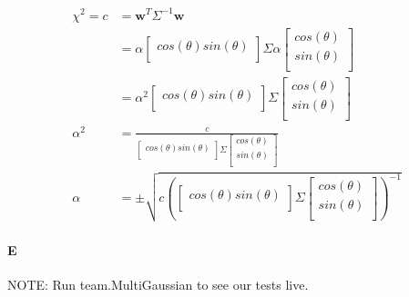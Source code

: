 \documentclass[12pt]{article}
\begin{document}
\begin{align*}
\chi^2 = c &=  \mathbf{w}^T \Sigma^{-1} \mathbf{w} \\
&=  \alpha \left[ {\begin{smallmatrix}
	cos(\theta)  sin(\theta)  \\
	 \end{smallmatrix} } \right]
 	\Sigma
 	\alpha \left[ {\begin{smallmatrix}
	cos(\theta)  \\
	sin(\theta)  \\
	 \end{smallmatrix} } \right] \\
&= \alpha^2 \left[ {\begin{smallmatrix}
	cos(\theta)  sin(\theta)  \\
	 \end{smallmatrix} } \right]
 	\Sigma
 	\left[ {\begin{smallmatrix}
	cos(\theta)  \\
	sin(\theta)  \\
	 \end{smallmatrix} } \right] \\
\alpha^2 &= \frac{c}{\left[ {\begin{smallmatrix}
	cos(\theta)  sin(\theta)  \\
	 \end{smallmatrix} } \right]
 	\Sigma
 	\left[ {\begin{smallmatrix}
	cos(\theta)  \\
	sin(\theta)  \\
	 \end{smallmatrix} } \right]} \\
\alpha &=\pm\sqrt{ c \left( \left[ {\begin{smallmatrix}
	cos(\theta)  sin(\theta)  \\
	 \end{smallmatrix} } \right]
 	\Sigma
 	\left[ {\begin{smallmatrix}
	cos(\theta)  \\
	sin(\theta)  \\
	 \end{smallmatrix} } \right]
	 \right)^{-1}}
\end{align*}


\paragraph{E}
NOTE: Run team.MultiGaussian to see our tests live.
\end{document}
